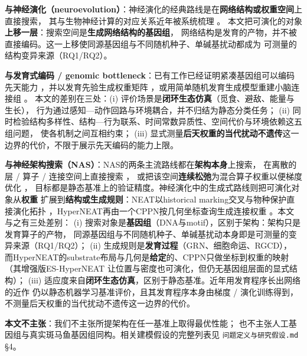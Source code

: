 \textbf{与神经演化（neuroevolution）}：神经演化的经典路线是在\textbf{网络结构或权重空间}上直接搜索，
其与生物神经计算的对应关系近年被系统梳理 \citep{bib5_miikkulainen2025}。
本文把可演化的对象\textbf{上移一层}：搜索空间是\textbf{生成网络结构的基因组}，
网络结构是发育的产物，并不被直接编码。这一上移使同源基因组与不同随机种子、单碱基扰动都成为
可测量的结构变异来源（RQ1/RQ2）。

\textbf{与发育式编码 / genomic bottleneck}：已有工作已经证明紧凑基因组可以编码先天能力
\citep{bib1_zador2019,bib3_shuvaev2024}，并以发育先验生成权重矩阵
\citep{bib2_barabasi2023}，或用简单随机发育生成模型重建小脑连接组 \citep{bib4_richter2025}。
本文的差别在三处：(i) 评价场景是\textbf{闭环生态仿真}（觅食、避敌、能量与生长），
行为通过感知—动作回路与环境耦合，并不归结为静态分类任务；
(ii) 同时检验结构多样性、结构—行为联系、时间常数异质性、空间代价与环境依赖这五组问题，
使各机制之间互相约束；
(iii) 显式测量\textbf{后天权重的当代扰动不遗传}这一边界的代价，不限于展示先天编码的能力上限。

\textbf{与神经架构搜索（NAS）}：NAS的两条主流路线都在\textbf{架构本身}上搜索，
在离散的层 / 算子 / 连接空间上直接搜索 \citep{bib224_elsken2019}，
或把该空间\textbf{连续松弛}为混合算子权重以便梯度优化 \citep{bib225_liu2019}，
目标都是静态基准上的验证精度。神经演化中的生成式路线则把可演化对象从\textbf{权重}
扩展到\textbf{结构或生成规则}：NEAT以historical marking交叉与物种保护直接演化拓扑
\citep{bib222_stanley2002}，HyperNEAT再由一个CPPN按几何坐标查询生成连接权重
\citep{bib223_stanley2009}。本文与之有三处差别：
(i) 搜索对象是\textbf{基因组}（DNA与motif），区别于架构：架构只是发育算子的产物，
同源基因组与不同随机种子、单碱基扰动本身即是可测量的变异来源（RQ1/RQ2）；
(ii) 生成规则是\textbf{发育过程}（GRN、细胞命运、RGCD），
而HyperNEAT的substrate布局与几何是\textbf{给定}的、CPPN只做坐标到权重的映射
（其增强版ES-HyperNEAT \citep{bib124_risi2012} 让位置与密度也可演化，但仍无基因组层面的显式结构）；
(iii) 适应度来自\textbf{闭环生态仿真}，区别于静态基准。近年用发育程序长出网络的近作
\citep{bib226_najarro2023} 仍以静态机器学习基准评价，且其发育程序本身由梯度 / 演化训练得到，
不测量后天权重的当代扰动不遗传这一边界的代价。

\textbf{本文不主张}：我们不主张所提架构在任一基准上取得最优性能；
也不主张人工基因组与真实斑马鱼基因组同构。相关建模假设的完整列表见
\texttt{问题定义与研究假设.md} \S4。
